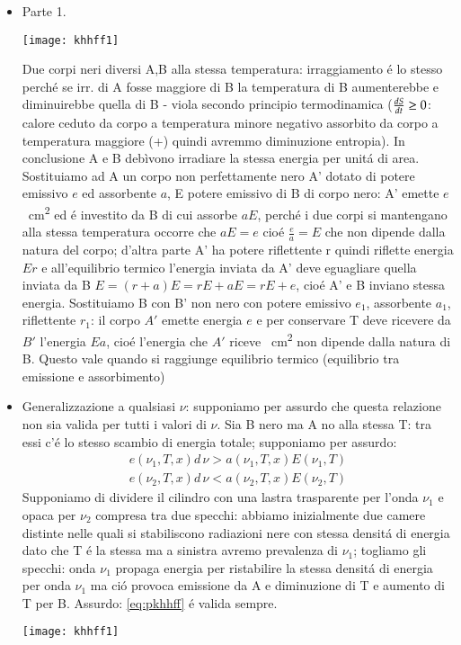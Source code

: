 \documentclass[main.tex]{subfiles}
\begin{document}
\begin{itemize}
    \item Parte 1.
        \begin{minipage}{\linewidth}
            \centering
            \texttt{[image: khhff1]}
        \end{minipage}
        Due corpi neri diversi A,B alla stessa temperatura: irraggiamento \'e lo stesso perch\'e se irr. di A fosse maggiore di B la temperatura di B aumenterebbe e diminuirebbe quella di B  - viola secondo principio termodinamica ($\TDy{t}{S}\geq0$: calore ceduto da corpo a temperatura minore negativo assorbito da corpo a temperatura maggiore (+) quindi avremmo diminuzione entropia). In conclusione A e B debìvono irradiare la stessa energia per unit\'a di area.
        Sostituiamo ad A un corpo non perfettamente nero A' dotato di potere emissivo $e$ ed assorbente $a$, E potere emissivo di B di corpo nero: A' emette $e$ \si{\per\square\cm} ed \'e investito da B di cui assorbe $aE$, perch\'e i due corpi si mantengano alla stessa temperatura occorre che $aE=e$ cio\'e $\frac{e}{a}=E$ che non dipende dalla natura del corpo; d'altra parte A' ha potere riflettente r quindi riflette energia $Er$ e all'equilibrio termico l'energia inviata da A' deve eguagliare quella inviata da B $E=(r+a)E=rE+aE=rE+e$, cio\'e A' e B inviano stessa energia.
        Sostituiamo B con B' non nero con potere emissivo $e_1$, assorbente $a_1$, riflettente $r_1$: il corpo $A'$ emette energia $e$ e per conservare T deve ricevere da $B'$ l'energia $Ea$, cio\'e l'energia che $A'$ riceve \si{\per\square\cm} non dipende dalla natura di B.
        Questo vale quando si raggiunge equilibrio termico (equilibrio tra emissione e assorbimento)
    \item Generalizzazione a qualsiasi $\nu$: supponiamo per assurdo che questa relazione non sia valida per tutti i valori di $\nu$. Sia B nero ma A no alla stessa T: tra essi c'\'e lo stesso scambio di energia totale; supponiamo per assurdo:
        \begin{align*}
            e(\nu_1,T,x)d\,\nu>a(\nu_1,T,x)E(\nu_1,T)\\
            e(\nu_2,T,x)d\,\nu<a(\nu_2,T,x)E(\nu_2,T)%
        \end{align*}
        Supponiamo di dividere il cilindro con una lastra trasparente per l'onda $\nu_1$ e opaca per $\nu_2$ compresa tra due specchi: abbiamo inizialmente due camere distinte nelle quali si stabiliscono radiazioni nere con stessa densit\'a di energia dato che T \'e la stessa ma a sinistra avremo prevalenza di $\nu_1$; togliamo gli specchi: onda $\nu_1$ propaga energia per ristabilire la stessa densit\'a di energia per onda $\nu_1$ ma ci\'o provoca emissione da A e diminuzione di T e aumento di T per B. Assurdo: \ref{eq:pkhhff} \'e valida sempre.
        \begin{minipage}{\linewidth}
            \centering
            \texttt{[image: khhff1]}
        \end{minipage}
\end{itemize}
\end{document}
